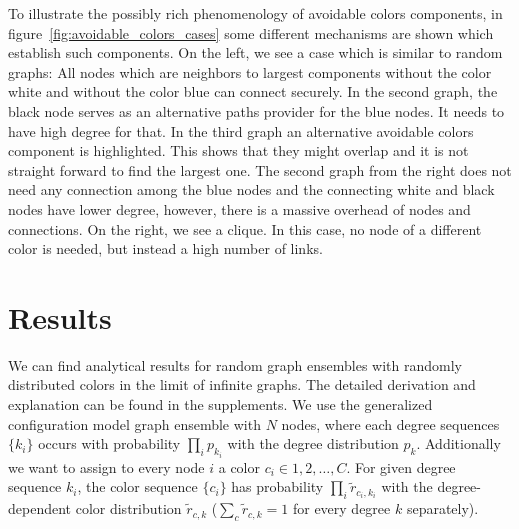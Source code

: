 \documentclass[aps, pre, twocolumn, a4paper, floatfix]{revtex4}
\begin{document}
%
To illustrate the possibly rich phenomenology of avoidable colors components, in 
figure~\ref{fig:avoidable_colors_cases} some different mechanisms are shown 
which establish such components. On the left, we see a case which is similar to 
random graphs: All nodes which are 
neighbors to largest components without the color white and without the color blue 
can connect securely. In the second graph, the black node serves 
as an alternative paths provider for the blue nodes. It needs to have high degree for 
that. In the third graph an alternative avoidable colors component is highlighted. 
This shows that they might overlap and it is not straight forward to find the largest 
one. The second graph from the right does not need any connection among the blue nodes 
and the connecting white and black nodes have lower degree, however, there is a massive 
overhead of nodes and connections. On the right, we see a clique. In this case, no node 
of a different color is needed, but instead a high number of links.




\section{Results}

We can find analytical results for random graph ensembles with randomly distributed 
colors in the limit of infinite graphs. The detailed derivation and explanation 
can be found in the supplements. We use the generalized configuration model graph 
ensemble with $N$ nodes, where each degree sequences $\{k_i\}$ occurs with probability 
$\prod_i p_{k_i}$ with the degree distribution $p_{k}$. Additionally we want to assign to 
every node $i$ a color $c_i\in 1,2,\dots,C$. For given degree sequence $k_i$, the color 
sequence $\{c_i\}$ has probability $\prod_i {\tilde r}_{c_i,k_i}$ with the degree-dependent 
color distribution ${\tilde r}_{c,k}$ ($\sum_c {\tilde r}_{c,k}=1$ for every degree $k$ 
separately). 
\end{document}
